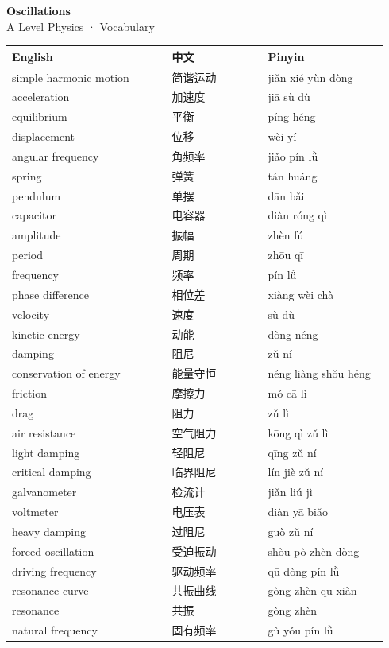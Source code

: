 \documentclass[11pt]{article}
\begin{document}
\begin{center}
  {\LARGE\bfseries Oscillations}\\[0.35em]
  {\large A Level Physics · Vocabulary}
\end{center}
\vspace{0.6em}

\begin{longtable}{@{}p{0.40\linewidth}p{0.24\linewidth}p{0.30\linewidth}@{}}
\toprule
\textbf{English} & \textbf{中文} & \textbf{Pinyin} \\
\midrule
\endhead
\bottomrule
\endlastfoot
simple harmonic motion & 简谐运动 & jiǎn xié yùn dòng \\
acceleration & 加速度 & jiā sù dù \\
equilibrium & 平衡 & píng héng \\
displacement & 位移 & wèi yí \\
angular frequency & 角频率 & jiǎo pín lǜ \\
spring & 弹簧 & tán huáng \\
pendulum & 单摆 & dān bǎi \\
capacitor & 电容器 & diàn róng qì \\
amplitude & 振幅 & zhèn fú \\
period & 周期 & zhōu qī \\
frequency & 频率 & pín lǜ \\
phase difference & 相位差 & xiàng wèi chà \\
velocity & 速度 & sù dù \\
kinetic energy & 动能 & dòng néng \\
damping & 阻尼 & zǔ ní \\
conservation of energy & 能量守恒 & néng liàng shǒu héng \\
friction & 摩擦力 & mó cā lì \\
drag & 阻力 & zǔ lì \\
air resistance & 空气阻力 & kōng qì zǔ lì \\
light damping & 轻阻尼 & qīng zǔ ní \\
critical damping & 临界阻尼 & lín jiè zǔ ní \\
galvanometer & 检流计 & jiǎn liú jì \\
voltmeter & 电压表 & diàn yā biǎo \\
heavy damping & 过阻尼 & guò zǔ ní \\
forced oscillation & 受迫振动 & shòu pò zhèn dòng \\
driving frequency & 驱动频率 & qū dòng pín lǜ \\
resonance curve & 共振曲线 & gòng zhèn qū xiàn \\
resonance & 共振 & gòng zhèn \\
natural frequency & 固有频率 & gù yǒu pín lǜ \\
\end{longtable}
\end{document}
